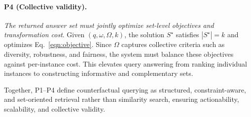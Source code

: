 \paragraph{\textbf{P4 (Collective validity).}} 
\emph{The returned answer set must jointly optimize set-level objectives and transformation cost}. Given $(q,\omega,\Omega,k)$, the solution $S^\star$ satisfies $|S^\star|=k$ and optimizes Eq.~\eqref{eqn:objective}. Since $\Omega$ captures collective criteria such as diversity, robustness, and fairness, the system must balance these objectives against per-instance cost. This elevates query answering from ranking individual instances to constructing informative and complementary sets.

Together, P1--P4 define counterfactual querying as structured, constraint-aware, and set-oriented retrieval rather than similarity search, ensuring actionability, scalability, and collective validity.